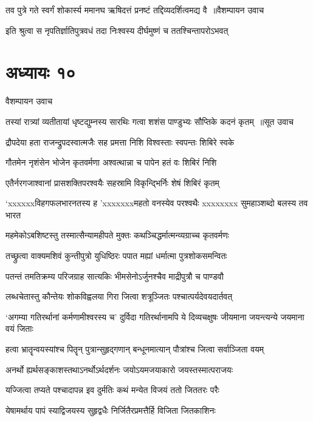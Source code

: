 \threelineshloka
{तव पुत्रे गते स्वर्गं शोकार्स्य ममानघ}
{ऋषिदत्तं प्रनष्टं तद्दिव्यदर्शित्वमद्य वै ॥वैशम्पायन उवाच}
{}


\twolineshloka
{इति श्रुत्वा स नृपतिर्ज्ञातिपुत्रवधं तदा}
{निःश्वस्य दीर्घमुष्णं च ततश्चिन्तापरोऽभवत्}


\chapter{अध्यायः १०}
\twolineshloka
{वैशम्पायन उवाच}
{}


\threelineshloka
{तस्यां रात्र्यां व्यतीतायां धृष्टद्युम्नस्य सारथिः}
{गत्वा शशंस पाण्डुभ्यः सौप्तिके कदनं कृतम् ॥सूत उवाच}
{}


\twolineshloka
{द्रौपदेया हता राजन्द्रुपदस्वात्मजैः सह}
{प्रमत्ता निशि विश्वस्ताः स्वपन्तः शिबिरे स्वके}


\twolineshloka
{गौतमेन नृशंसेन भोजेन कृतवर्मणा}
{अश्वत्थान्ना च पापेन हतं वः शिबिरं निशि}


\twolineshloka
{एतैर्नरगजाश्वानां प्रासशक्तिपरश्वयैः}
{सहस्रामि विकृन्द्भिर्निः शेषं शिबिरं कृतम्}


\threelineshloka
{`xxxxxxविहगफलभारनतस्य ह}
{'xxxxxxxमहतो वनस्येव परश्वथैः}
{xxxxxxxx सुमहाञ्शब्दो बलस्य तव भारत}


\twolineshloka
{महमेकोऽबशिष्टस्तु तस्मात्सैन्यामहीपते}
{मुक्तः कथञ्चिद्धर्मात्मन्व्यग्राच्च कृतवर्मणः}


\twolineshloka
{तच्छ्रुत्वा वाक्यमशिवं कुन्तीपुत्रो युधिष्ठिरः}
{पपात मह्यां धर्मात्मा पुत्रशोकसमन्वितः}


\twolineshloka
{पतन्तं तमतिक्रम्य परिजग्राह सात्यकिः}
{भीमसेनोऽर्जुनश्चैव माद्रीपुत्रौ च पाण्डवौ}


\twolineshloka
{लब्धचेतास्तु कौन्तेयः शोकविह्वलया गिरा}
{जित्वा शत्रूञ्जितः पश्चात्पर्यदेवयदार्तवत्}


\threelineshloka
{`अगम्या गतिरर्थानां कर्मणामीश्वरस्य च'}
{दुर्विदा गतिरर्थानामपि ये दिव्यचक्षुषः}
{जीयमाना जयन्त्यन्ये जयमाना वयं जिताः}


\twolineshloka
{हत्वा भ्रातॄन्वयस्यांश्च पितॄन् पुत्रान्सुहृद्गणान्}
{बन्धूनमात्यान् पौत्रांश्च जित्वा सर्वाञ्जिता वयम्}


\twolineshloka
{अनर्थो ह्यर्थसङ्काशस्तथाऽनर्थोऽर्थदर्शनः}
{जयोऽयमजयाकारो जयस्तस्मात्पराजयः}


\twolineshloka
{यज्जित्वा तप्यते पश्चादापन्न इव दुर्मतिः}
{कथं मन्येत विजयं ततो जिततरः परैः}


\twolineshloka
{येषामर्थाय पापं स्याद्विजयस्य सुहृद्वधैः}
{निर्जितैरप्रमत्तैर्हि विजिता जितकाशिनः}


